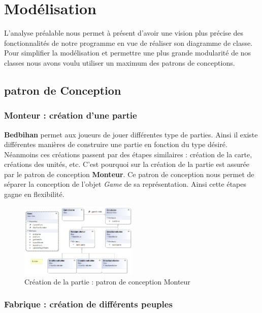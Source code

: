 \section{Modélisation}

	L'analyse préalable nous permet à présent d'avoir une vision plus précise des fonctionnalités de notre programme en vue de réaliser son diagramme de classe. Pour simplifier la modélisation et permettre une plus grande modularité de nos classes nous avons voulu utiliser un maximum des patrons de conceptions. 

	\subsection{patron de Conception}

		\subsubsection{Monteur : création d'une partie}

		\textbf{Bedbihan} permet aux joueurs de jouer différentes type de parties. Ainsi il existe différentes manières de construire une partie en fonction du type désiré. Néanmoins ces créations passent par des étapes similaires : création de la carte, créations des unités, etc. C'est pourquoi sur  la création de la partie est assurée par le patron de conception \textbf{Monteur}. Ce patron de conception nous permet de séparer la conception de l'objet \emph{Game} de sa représentation. Ainsi cette étapes gagne en flexibilité. 

		\begin{figure}[h]
		\begin{center}
			\includegraphics[width=0.5\textwidth]{figure/builder.png}
		\end{center}
		\caption{Création de la partie : patron de conception Monteur}
		\label{fig:builder}
	\end{figure}

		\subsubsection{Fabrique : création de différents peuples}

